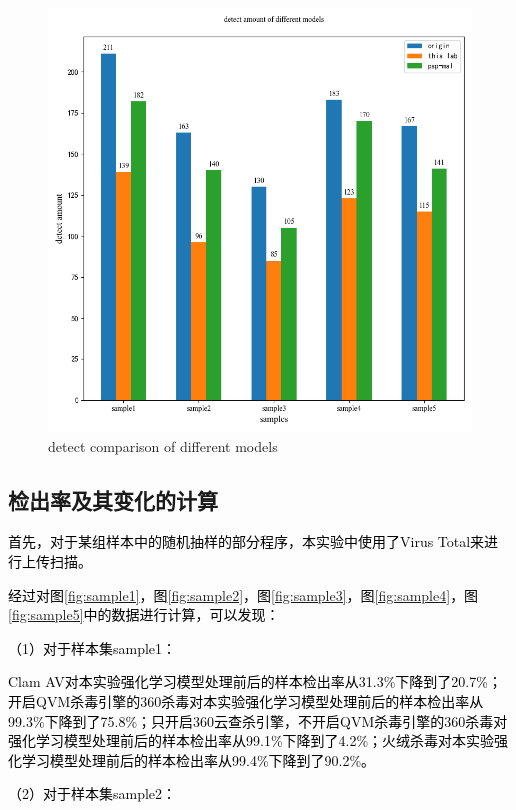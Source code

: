 \begin{figure}[htbp]
  \centering
  \includegraphics[scale=0.60]{images/compare_with_different_model.png}
  \caption{detect comparison of different models}\label{fig:compare_with_different_model}
\end{figure}
\subsection{检出率及其变化的计算}

\textcolor{black}{首先，对于某组样本中的随机抽样的部分程序，本实验中使用了Virus Total来进行上传扫描。}

\textcolor{black}{经过对图\ref{fig:sample1}，图\ref{fig:sample2}，图\ref{fig:sample3}，图\ref{fig:sample4}，图\ref{fig:sample5}中的数据进行计算，可以发现：}

\textcolor{black}{（1）对于样本集sample1：}

\textcolor{black}{Clam AV对本实验强化学习模型处理前后的样本检出率从31.3\%下降到了20.7\%；开启QVM杀毒引擎的360杀毒对本实验强化学习模型处理前后的样本检出率从99.3\%下降到了75.8\%；只开启360云查杀引擎，不开启QVM杀毒引擎的360杀毒对强化学习模型处理前后的样本检出率从99.1\%下降到了4.2\%；火绒杀毒对本实验强化学习模型处理前后的样本检出率从99.4\%下降到了90.2\%。}

\textcolor{black}{（2）对于样本集sample2：}

